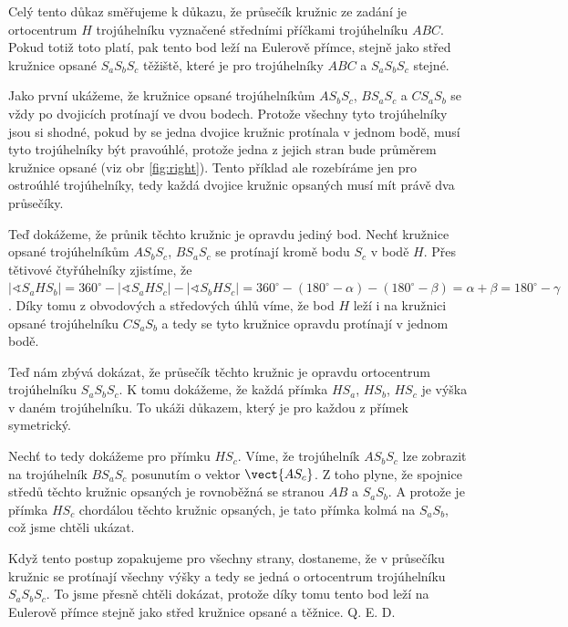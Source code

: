 \documentclass{fkssolpub}
\author{Ondřej Sedláček}
\renewcommand{\angle}{\sphericalangle}
\begin{document}
Celý tento důkaz směřujeme k důkazu, že průsečík kružnic ze zadání je ortocentrum $H$ trojúhelníku vyznačené středními příčkami trojúhelníku $ABC$. Pokud totiž toto platí, pak tento bod leží na Eulerově přímce, stejně jako střed kružnice opsané $S_aS_bS_c$ těžiště, které je pro trojúhelníky $ABC$ a $S_aS_bS_c$ stejné.

Jako první ukážeme, že kružnice opsané trojúhelníkům $AS_bS_c$, $BS_aS_c$ a $CS_aS_b$ se vždy po dvojicích protínají ve dvou bodech. Protože všechny tyto trojúhelníky jsou si shodné, pokud by se jedna dvojice kružnic protínala v jednom bodě, musí tyto trojúhelníky být pravoúhlé, protože jedna z jejich stran bude průměrem kružnice opsané (viz obr \ref{fig:right}). Tento příklad ale rozebíráme jen pro ostroúhlé trojúhelníky, tedy každá dvojice kružnic opsaných musí mít právě dva průsečíky.

Teď dokážeme, že průnik těchto kružnic je opravdu jediný bod. Nechť kružnice opsané trojúhelníkům $AS_bS_c$, $BS_aS_c$ se protínají kromě bodu $S_c$ v bodě $H$. Přes tětivové čtyřúhelníky zjistíme, že $|\angle S_aHS_b| = 360^{\circ} - |\angle S_aHS_c| - |\angle S_bHS_c| = 360^{\circ} - (180^{\circ} - \alpha) - (180^{\circ} - \beta) = \alpha + \beta = 180^{\circ} - \gamma$. Díky tomu z obvodových a středových úhlů víme, že bod $H$ leží i na kružnici opsané trojúhelníku $CS_aS_b$ a tedy se tyto kružnice opravdu protínají v jednom bodě.

Teď nám zbývá dokázat, že průsečík těchto kružnic je opravdu ortocentrum trojúhelníku $S_aS_bS_c$. K tomu dokážeme, že každá přímka $HS_a$, $HS_b$, $HS_c$ je výška v daném trojúhelníku. To ukáži důkazem, který je pro každou z přímek symetrický.

Nechť to tedy dokážeme pro přímku $HS_c$. Víme, že trojúhelník $AS_bS_c$ lze zobrazit na trojúhelník $BS_aS_c$ posunutím o vektor $\vect{AS_c}$. Z toho plyne, že spojnice středů těchto kružnic opsaných je rovnoběžná se stranou $AB$ a $S_aS_b$. A protože je přímka $HS_c$ chordálou těchto kružnic opsaných, je tato přímka kolmá na $S_aS_b$, což jsme chtěli ukázat.

Když tento postup zopakujeme pro všechny strany, dostaneme, že v průsečíku kružnic se protínají všechny výšky a tedy se jedná o ortocentrum trojúhelníku $S_aS_bS_c$. To jsme přesně chtěli dokázat, protože díky tomu tento bod leží na Eulerově přímce stejně jako střed kružnice opsané a těžnice. Q. E. D.
\end{document}
